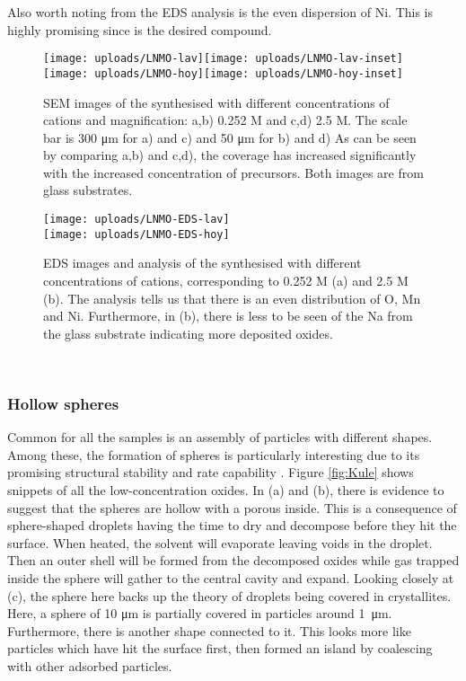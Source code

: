 \documentclass[Main/main.tex]{subfiles}
\begin{document}
Also worth noting from the EDS analysis is the even dispersion of Ni. This is highly promising since  is the desired compound. 

\begin{figure}[ht]
    \centering
	\texttt{[image: uploads/LNMO-lav]}\texttt{[image: uploads/LNMO-lav-inset]} \\
	\texttt{[image: uploads/LNMO-hoy]}\texttt{[image: uploads/LNMO-hoy-inset]}
	\caption{SEM images of the synthesised  with different concentrations of cations and magnification: a,b) 0.252 M and c,d) 2.5 M. The scale bar is 300 \si{\micro m} for a) and c) and 50 \si{\micro m} for b) and d) As can be seen by comparing a,b) and c,d), the coverage has increased significantly with the increased concentration of precursors. Both images are from glass substrates.}
	\label{fig:LNMO_diff}
\end{figure}

\begin{figure}[ht]
    \centering
	\raisebox{7cm}{a)} \texttt{[image: uploads/LNMO-EDS-lav]} \\[0.5em]
	\raisebox{7cm}{b)} \texttt{[image: uploads/LNMO-EDS-hoy]} 
	\caption{EDS images and analysis of the synthesised  with different concentrations of cations, corresponding to 0.252 M (a) and 2.5 M (b). The analysis tells us that there is an even distribution of O, Mn and Ni. Furthermore, in (b), there is less to be seen of the Na from the glass substrate indicating more deposited oxides.}
	\label{fig:LNMO_EDS} 
\end{figure}


\FloatBarrier ~\\[-4em]
\subsubsection{Hollow spheres}
Common for all the samples is an assembly of particles with different shapes. Among these, the formation of spheres is particularly interesting due to its promising structural stability and rate capability \cite{elmat_sprayp}. Figure \ref{fig:Kule} shows snippets of all the low-concentration oxides. In (a) and (b), there is evidence to suggest that the spheres are hollow with a porous inside. This is a  consequence of sphere-shaped droplets having the time to dry and decompose before they hit the surface. When heated, the solvent will evaporate leaving voids in the droplet. Then an outer shell will be formed from the decomposed oxides while gas trapped inside the sphere will gather to the central cavity and expand.
Looking closely at (c), the sphere here backs up the theory of droplets being covered in crystallites. Here, a sphere of 10 \si{\micro m} is partially covered in particles around \SI{1}{\micro m}. Furthermore, there is another shape connected to it. This looks more like particles which have hit the surface first, then formed an island by coalescing with other adsorbed particles. 
\end{document}
